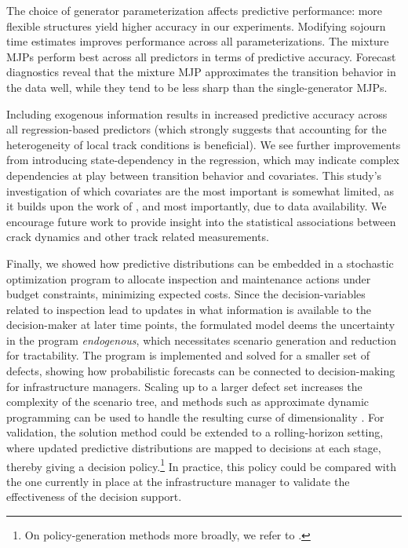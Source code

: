 \documentclass{article}
\begin{document}
The choice of generator parameterization affects predictive performance: more flexible structures yield higher accuracy in our experiments. Modifying sojourn time estimates improves performance across all parameterizations. 
The mixture MJPs perform best across all predictors in terms of predictive accuracy. Forecast diagnostics reveal that the mixture MJP approximates the transition behavior in the data well, while they tend to be less sharp than the single-generator MJPs.

Including exogenous information results in increased predictive accuracy across all regression-based predictors (which strongly suggests that accounting for the heterogeneity of local track conditions is beneficial). We see further improvements from introducing state-dependency in the regression, which may indicate complex dependencies at play between transition behavior and covariates. This study's investigation of which covariates are the most important is somewhat limited, as it builds upon the work of \citet{bisgaard2024A}, and most importantly, due to data availability. We encourage future work to provide insight into the statistical associations between crack dynamics and other track related measurements.

Finally, we showed how predictive distributions can be embedded in a stochastic optimization program to allocate inspection and maintenance actions under budget constraints, minimizing expected costs. 
Since the decision-variables related to inspection lead to updates in what information is available to the decision-maker at later time points, the formulated model deems the uncertainty in the program \textit{endogenous}, which necessitates scenario generation and reduction for tractability.
The program is implemented and solved for a smaller set of defects, showing how probabilistic forecasts can be connected to decision-making for infrastructure managers. Scaling up to a larger defect set increases the complexity of the scenario tree, and methods such as approximate dynamic programming can be used to handle the resulting curse of dimensionality \citep{powell2016a}. For validation, the solution method could be extended to a rolling-horizon setting, where updated predictive distributions are mapped to decisions at each stage, thereby giving a decision policy.\footnote{On policy-generation methods more broadly, we refer to \citet{powell2018a}.} In practice, this policy could be compared with the one currently in place at the infrastructure manager to validate the effectiveness of the decision support.
\end{document}
